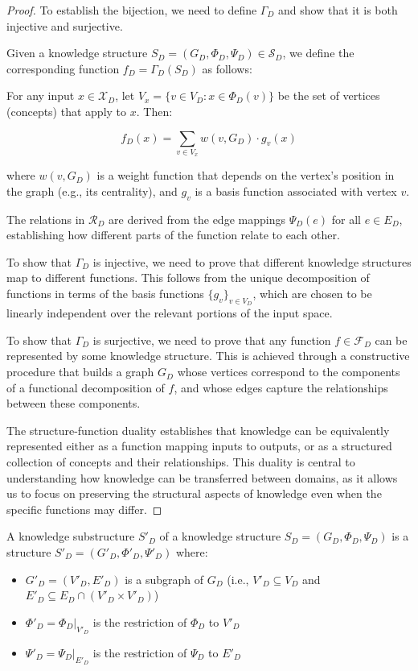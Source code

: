 \begin{proof}
To establish the bijection, we need to define $\Gamma_D$ and show that it is both injective and surjective.

Given a knowledge structure $S_D = (G_D, \Phi_D, \Psi_D) \in \mathcal{S}_D$, we define the corresponding function $f_D = \Gamma_D(S_D)$ as follows:

For any input $x \in \mathcal{X}_D$, let $V_x = \{v \in V_D : x \in \Phi_D(v)\}$ be the set of vertices (concepts) that apply to $x$. Then:

\begin{equation}
f_D(x) = \sum_{v \in V_x} w(v, G_D) \cdot g_v(x)
\end{equation}

where $w(v, G_D)$ is a weight function that depends on the vertex's position in the graph (e.g., its centrality), and $g_v$ is a basis function associated with vertex $v$.

The relations in $\mathcal{R}_D$ are derived from the edge mappings $\Psi_D(e)$ for all $e \in E_D$, establishing how different parts of the function relate to each other.

To show that $\Gamma_D$ is injective, we need to prove that different knowledge structures map to different functions. This follows from the unique decomposition of functions in terms of the basis functions $\{g_v\}_{v \in V_D}$, which are chosen to be linearly independent over the relevant portions of the input space.

To show that $\Gamma_D$ is surjective, we need to prove that any function $f \in \mathcal{F}_D$ can be represented by some knowledge structure. This is achieved through a constructive procedure that builds a graph $G_D$ whose vertices correspond to the components of a functional decomposition of $f$, and whose edges capture the relationships between these components.

The structure-function duality establishes that knowledge can be equivalently represented either as a function mapping inputs to outputs, or as a structured collection of concepts and their relationships. This duality is central to understanding how knowledge can be transferred between domains, as it allows us to focus on preserving the structural aspects of knowledge even when the specific functions may differ.
\end{proof}

\begin{definition}
A knowledge substructure $S'_D$ of a knowledge structure $S_D = (G_D, \Phi_D, \Psi_D)$ is a structure $S'_D = (G'_D, \Phi'_D, \Psi'_D)$ where:
\begin{itemize}
    \item $G'_D = (V'_D, E'_D)$ is a subgraph of $G_D$ (i.e., $V'_D \subseteq V_D$ and $E'_D \subseteq E_D \cap (V'_D \times V'_D)$)
    \item $\Phi'_D = \Phi_D|_{V'_D}$ is the restriction of $\Phi_D$ to $V'_D$
    \item $\Psi'_D = \Psi_D|_{E'_D}$ is the restriction of $\Psi_D$ to $E'_D$
\end{itemize}
\end{definition}

